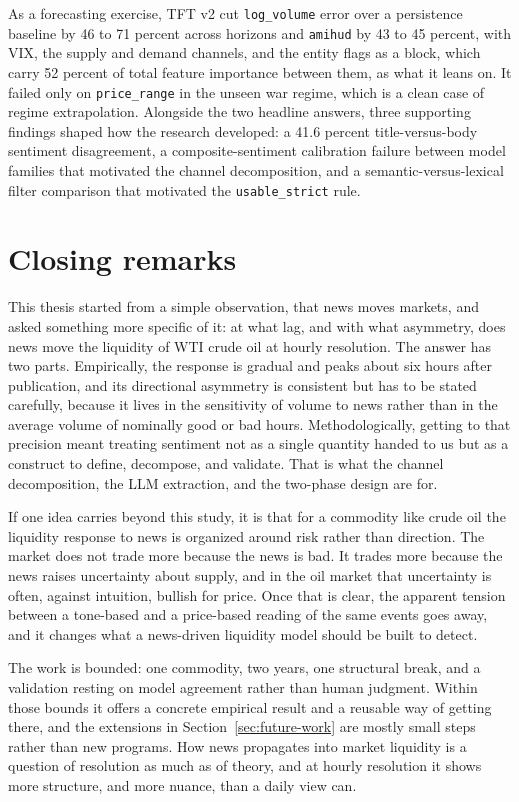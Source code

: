 As a forecasting exercise, TFT v2 cut \texttt{log\_volume} error over a persistence baseline by 46 to 71 percent across horizons and \texttt{amihud} by 43 to 45 percent, with VIX, the supply and demand channels, and the entity flags as a block, which carry 52 percent of total feature importance between them, as what it leans on. It failed only on \texttt{price\_range} in the unseen war regime, which is a clean case of regime extrapolation. Alongside the two headline answers, three supporting findings shaped how the research developed: a 41.6 percent title-versus-body sentiment disagreement, a composite-sentiment calibration failure between model families that motivated the channel decomposition, and a semantic-versus-lexical filter comparison that motivated the \texttt{usable\_strict} rule.

\section{Closing remarks}\label{sec:closing}

This thesis started from a simple observation, that news moves markets, and asked something more specific of it: at what lag, and with what asymmetry, does news move the liquidity of WTI crude oil at hourly resolution. The answer has two parts. Empirically, the response is gradual and peaks about six hours after publication, and its directional asymmetry is consistent but has to be stated carefully, because it lives in the sensitivity of volume to news rather than in the average volume of nominally good or bad hours. Methodologically, getting to that precision meant treating sentiment not as a single quantity handed to us but as a construct to define, decompose, and validate. That is what the channel decomposition, the LLM extraction, and the two-phase design are for.

If one idea carries beyond this study, it is that for a commodity like crude oil the liquidity response to news is organized around risk rather than direction. The market does not trade more because the news is bad. It trades more because the news raises uncertainty about supply, and in the oil market that uncertainty is often, against intuition, bullish for price. Once that is clear, the apparent tension between a tone-based and a price-based reading of the same events goes away, and it changes what a news-driven liquidity model should be built to detect.

The work is bounded: one commodity, two years, one structural break, and a validation resting on model agreement rather than human judgment. Within those bounds it offers a concrete empirical result and a reusable way of getting there, and the extensions in Section~\ref{sec:future-work} are mostly small steps rather than new programs. How news propagates into market liquidity is a question of resolution as much as of theory, and at hourly resolution it shows more structure, and more nuance, than a daily view can.
